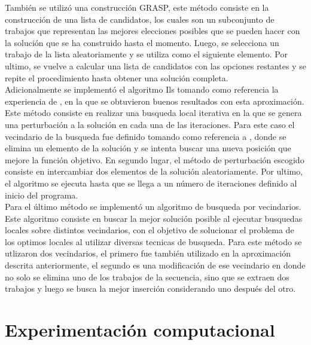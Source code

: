 \documentclass[10pt, twoside]{article}
\begin{document}
También se utilizó una construcción GRASP, este método consiste en la
construcción de una lista de candidatos, los cuales son un subconjunto
de trabajos que representan las mejores elecciones posibles que se pueden hacer
con la solución que se ha construido hasta el momento. Luego, se selecciona un
trabajo de la lista aleatoriamente y se utiliza como el siguiente elemento. Por
ultimo, se vuelve a calcular una lista de candidatos con las opciones restantes
y se repite el procedimiento hasta obtener una solución completa.\\

Adicionalmente se implementó el algoritmo Ils tomando como referencia la
experiencia de \cite{ils}, en la que se obtuvieron buenos resultados con esta
aproximación. Este método consiste en realizar una busqueda local iterativa en
la que se genera una perturbación a la solución en cada una de las iteraciones.
Para este caso el vecindario de la busqueda fue definido tomando como referencia
a \cite{localsearch}, donde se elimina un elemento de la solución y se intenta 
buscar una nueva posición que mejore la función objetivo. En segundo lugar, el
método de perturbación escogido consiste en intercambiar dos elementos de la solución
aleatoriamente. Por ultimo, el algoritmo se ejecuta hasta que se llega a un
número de iteraciones definido al inicio del programa.\\

Para el último método se implementó un algoritmo de busqueda por vecindarios. Este
algoritmo consiste en buscar la mejor solución posible al ejecutar busquedas
locales sobre distintos vecindarios, con el objetivo de solucionar el problema
de los optimos locales al utilizar diversas tecnicas de busqueda. Para este método
se utlizaron dos vecindarios, el primero fue también utilizado en la aproximación
descrita anteriormente, el segundo es una modificación de ese vecindario en donde
no solo se elimina uno de los trabajos de la secuencia, sino que se extraen dos
trabajos y luego se busca la mejor inserción considerando uno después del otro. 

\section{Experimentación computacional}
\end{document}
